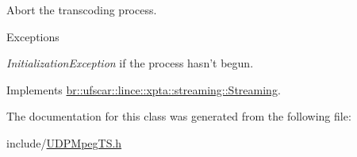 Abort the transcoding process. 


\begin{DoxyExceptions}{Exceptions}
\item[{\em InitializationException}]if the process hasn't begun. \end{DoxyExceptions}


Implements \hyperlink{classbr_1_1ufscar_1_1lince_1_1xpta_1_1streaming_1_1Streaming_a2d1975eb985a2854d4d6f4c36c002910}{br::ufscar::lince::xpta::streaming::Streaming}.



The documentation for this class was generated from the following file:\begin{DoxyCompactItemize}
\item 
include/\hyperlink{UDPMpegTS_8h}{UDPMpegTS.h}\end{DoxyCompactItemize}
